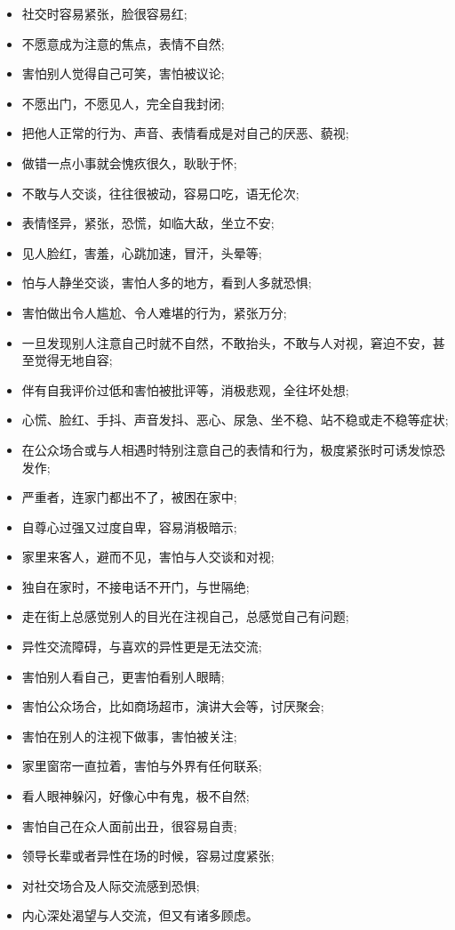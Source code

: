 \documentclass{ctexart}
\begin{document}
\begin{multicols}{2}
    \begin{itemize}
        \item 社交时容易紧张，脸很容易红;
        \item 不愿意成为注意的焦点，表情不自然;
        \item 害怕别人觉得自己可笑，害怕被议论;
        \item 不愿出门，不愿见人，完全自我封闭;
        \item 把他人正常的行为、声音、表情看成是对自己的厌恶、藐视;
        \item 做错一点小事就会愧疚很久，耿耿于怀;
        \item 不敢与人交谈，往往很被动，容易口吃，语无伦次;
        \item 表情怪异，紧张，恐慌，如临大敌，坐立不安;
        \item 见人脸红，害羞，心跳加速，冒汗，头晕等;
        \item 怕与人静坐交谈，害怕人多的地方，看到人多就恐惧;
        \item 害怕做出令人尴尬、令人难堪的行为，紧张万分;
        \item 一旦发现别人注意自己时就不自然，不敢抬头，不敢与人对视，窘迫不安，甚至觉得无地自容;
        \item 伴有自我评价过低和害怕被批评等，消极悲观，全往坏处想;
        \item 心慌、脸红、手抖、声音发抖、恶心、尿急、坐不稳、站不稳或走不稳等症状;
        \item 在公众场合或与人相遇时特别注意自己的表情和行为，极度紧张时可诱发惊恐发作;
        \item 严重者，连家门都出不了，被困在家中;
        \item 自尊心过强又过度自卑，容易消极暗示;
        \item 家里来客人，避而不见，害怕与人交谈和对视;
        \item 独自在家时，不接电话不开门，与世隔绝;
        \item 走在街上总感觉别人的目光在注视自己，总感觉自己有问题;
        \item 异性交流障碍，与喜欢的异性更是无法交流;
        \item 害怕别人看自己，更害怕看别人眼睛;
        \item 害怕公众场合，比如商场超市，演讲大会等，讨厌聚会;
        \item 害怕在别人的注视下做事，害怕被关注;
        \item 家里窗帘一直拉着，害怕与外界有任何联系;
        \item 看人眼神躲闪，好像心中有鬼，极不自然;
        \item 害怕自己在众人面前出丑，很容易自责;
        \item 领导长辈或者异性在场的时候，容易过度紧张;
        \item 对社交场合及人际交流感到恐惧;
        \item 内心深处渴望与人交流，但又有诸多顾虑。
    \end{itemize}
\end{multicols}
\end{document}
